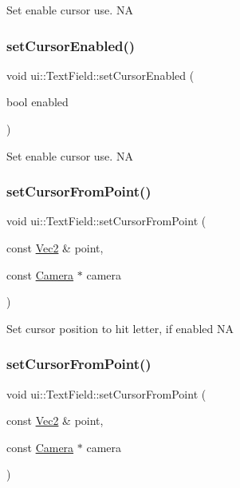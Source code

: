 Set enable cursor use.  NA \mbox{\label{classui_1_1TextField_acfbd7a912c166c1de933081466976f15}} 
\subsubsection{\texorpdfstring{set\+Cursor\+Enabled()}{setCursorEnabled()}\hspace{0.1cm}{\footnotesize\ttfamily [2/2]}}
{\footnotesize\ttfamily void ui\+::\+Text\+Field\+::set\+Cursor\+Enabled (\begin{DoxyParamCaption}\item[{bool}]{enabled }\end{DoxyParamCaption})}

Set enable cursor use.  NA \mbox{\label{classui_1_1TextField_a130ef17d3dda676d98b28e46f1d1f253}} 
\subsubsection{\texorpdfstring{set\+Cursor\+From\+Point()}{setCursorFromPoint()}\hspace{0.1cm}{\footnotesize\ttfamily [1/2]}}
{\footnotesize\ttfamily void ui\+::\+Text\+Field\+::set\+Cursor\+From\+Point (\begin{DoxyParamCaption}\item[{const \hyperlink{classVec2}{Vec2} \&}]{point,  }\item[{const \hyperlink{classCamera}{Camera} $\ast$}]{camera }\end{DoxyParamCaption})}

Set cursor position to hit letter, if enabled  NA \mbox{\label{classui_1_1TextField_a130ef17d3dda676d98b28e46f1d1f253}} 
\subsubsection{\texorpdfstring{set\+Cursor\+From\+Point()}{setCursorFromPoint()}\hspace{0.1cm}{\footnotesize\ttfamily [2/2]}}
{\footnotesize\ttfamily void ui\+::\+Text\+Field\+::set\+Cursor\+From\+Point (\begin{DoxyParamCaption}\item[{const \hyperlink{classVec2}{Vec2} \&}]{point,  }\item[{const \hyperlink{classCamera}{Camera} $\ast$}]{camera }\end{DoxyParamCaption})}

